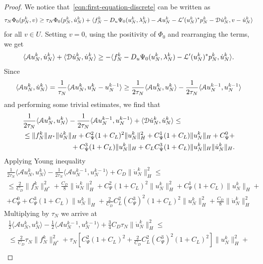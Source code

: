 \documentclass[a4paper,10pt,oneside]{amsbook}
\numberwithin{section}{chapter}
\numberwithin{equation}{chapter}
\theoremstyle{definition}
\DeclarePairedDelimiter{\norm}{\lVert}{\rVert}
\DeclarePairedDelimiter{\dual}{\langle}{\rangle}
\begin{document}
\begin{proof}
We notice that~\eqref{eqn:first-equation-discrete} can be written as
\begin{equation}
\label{eqn:inclusion-explicit}
\tau_N\Phi_0(p_N^k,v)\ge\tau_N\Phi_0(p_N^k,\dot u_N^k)+\dual{f_N^k-D_u\Psi_0(u_N^k,\lambda_N^k)-\mathcal{A}u_N^k-\mathcal{L}'(u_N^k)^*p_N^k-\mathcal{D}\dot u_N^k,v-\dot u_N^k}
\end{equation}
for all $v\in U$. Setting $v=0$, using the positivity of $\Phi_0$ and rearranging the terms, we get
\[
\dual{\mathcal{A}u_N^k,\dot u_N^k}+\dual{\mathcal{D}\dot u_N^k,\dot u_N^k}\ge-\dual{f_N^k-D_u\Psi_0(u_N^k,\lambda_N^k)-\mathcal{L}'(u_N^k)^*p_N^k,\dot u_N^k}.
\]
Since
\[
\dual{\mathcal{A}u_N^k,\dot u_N^k}=\frac{1}{\tau_N}\dual{\mathcal{A}u_N^k,u_N^k-u_N^{k-1}}\ge\frac{1}{2\tau_N}\dual{\mathcal{A}u_N^k,u_N^k}-\frac{1}{2\tau_N}\dual{\mathcal{A}u_N^{k-1},u_N^{k-1}}
\]
and performing some trivial estimates, we find that
\[
\begin{multlined}
\frac{1}{2\tau_N}\langle \mathcal Au_N^k,u_N^k\rangle-\frac{1}{2\tau_N}\langle \mathcal Au_N^{k-1},u_N^{k-1}\rangle+\langle \mathcal D\dot{u}_N^k,\dot{u}_N^k\rangle\le\\
\le\|f_N^k\|_{H^*}\|\dot{u}_N^k\|_H+C_\Psi^2(1+C_L)^2\norm{u_N^k}_H^2+C_\Psi^1(1+C_L)\norm{u_N^k}_H+C_\Psi^0+\\
+C_\Psi^3(1+C_L)\norm{u_N^k}_H+C_LC_\Psi^3(1+C_L)\|u_N^k\|_H\|\dot{u}_N^k\|_H.
\end{multlined}
\]
Applying Young inequality
\[
\begin{multlined}
\frac{1}{2\tau_N}\langle \mathcal{A}u_N^k,u_N^k\rangle-\frac{1}{2\tau_N}\langle \mathcal{A}u_N^{k-1},u_N^{k-1}\rangle+C_D\|\dot{u}_N^k\|_H^2\le\\
\le\frac{2}{C_D}\|f_N^k\|_{H^*}^2+\frac{C_D}{8}\|\dot{u}_N^k\|_H^2+C_\Psi^2(1+C_L)^2\|u_N^k\|_H^2+C_\Psi^1(1+C_L)\|u_N^k\|_H+\\
+C_\Psi^0+C_\Psi^3(1+C_L)\|u_N^k\|_H+\frac{2}{C_D}C_L^2(C_\Psi^3)^2(1+C_L)^2\|u_N^k\|_H^2+\frac{C_D}{8}\|\dot{u}_N^k\|_H^2
\end{multlined}
\]
Multiplying by $\tau_N$ we arrive at
\[
\begin{multlined}
\frac{1}{2}\langle \mathcal Au_N^k,u_N^k\rangle-\frac{1}{2}\langle\mathcal Au_N^{k-1},u_N^{k-1}\rangle+\frac{3}{4}C_D\tau_N\|\dot{u}_N^k\|_H^2\le\\
\le\frac{2}{C_D}\tau_N\|f_N^k\|_{H^*}^2+\tau_N\left[C_\Psi^2(1+C_L)^2+\frac{2}{C_D}C_L^2(C_\Psi^3)^2(1+C_L)^2\right]\|u_N^k\|_H^2+\\

\end{multlined}\]
\end{proof}
\end{document}
